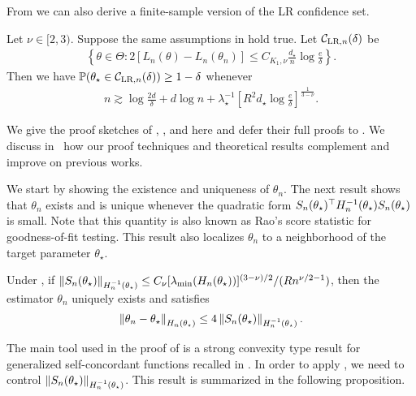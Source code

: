 From  we can also derive a finite-sample version of the LR confidence set.
\begin{corollary}\label{cor:lr_conf_set}
    Let $\nu \in [2, 3)$.
    Suppose the same assumptions in  hold true.
    Let $\mathcal{C}_{\text{LR}, n}(\delta)$ be
    \begin{align}\label{eq:lr_conf_set}
        \left\{\theta \in \Theta: 2[L_n(\theta) - L_n(\theta_n)] \le C_{K_1,\nu} \frac{d_\star}{n} \log{\frac{e}{\delta}} \right\}.
    \end{align}
    Then we have $\operatorname{\mathbb P}(\theta_\star \in \mathcal{C}_{\text{LR}, n}(\delta)) \ge 1 - \delta$ whenever
    \begin{align*}
        n \gtrsim \log{\frac{2d}{\delta}} + d\log{n} + \lambda_\star^{-1}\left[ R^2 d_\star \log{\frac{e}{\delta}} \right]^{\frac1{3-\nu}}.
    \end{align*}
\end{corollary}

We give the proof sketches of , , and  here and defer their full proofs to .
We discuss in~ 
how our proof techniques and theoretical results complement and improve on previous works.

We start by showing the existence and uniqueness of $\theta_n$.
The next result shows that $\theta_n$ exists and is unique whenever the quadratic form $S_n(\theta_\star)^\top H_n^{-1}(\theta_\star) S_n(\theta_\star)$ is small.
Note that this quantity is also known as Rao's score statistic for goodness-of-fit testing.
This result also localizes $\theta_n$ to a neighborhood of the target parameter $\theta_\star$.
\begin{proposition}\label{prop:localization}
    Under ,
    if $\left\lVert S_n(\theta_\star) \right\rVert_{H_n^{-1}(\theta_\star)} \le C_{\nu} [\lambda_{\min}(H_n(\theta_\star))]^{(3-\nu)/2} / (R n^{\nu/2-1})$,
    then the estimator $\theta_n$ uniquely exists and satisfies
    \begin{align*}
        \left\lVert \theta_n - \theta_\star \right\rVert_{H_n(\theta_\star)} \le 4 \left\lVert S_n(\theta_\star) \right\rVert_{H_n^{-1}(\theta_\star)}.
    \end{align*}
\end{proposition}

The main tool used in the proof of  is a strong convexity type result for generalized self-concordant functions recalled in .
In order to apply , we need to control $\left\lVert S_n(\theta_\star) \right\rVert_{H_n^{-1}(\theta_\star)}$.
This result is summarized in the following proposition.

